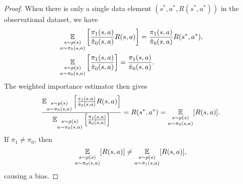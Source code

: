 \documentclass[12pt,letterpaper,boxed]{hmcpset}
\begin{document}
\begin{solution}
\begin{enumerate}[(a)]
    \begin{proof}
      When there is only a single data element $(s^*, a^*, R(s^*,a^*))$ in the observational dataset, we have
      \[
      \begin{aligned}
        & \operatorname*{\mathbb{E}}_{\substack{s \sim p(s) \\ a \sim \pi_0 (s,a)}}\qty[\frac{\pi_1(s,a)}{\hat \pi_0 (s,a)} R(s,a)] = \frac{\pi_1(s,a)}{\hat \pi_0 (s,a)} R(s^*,a^*), \\
        & \operatorname*{\mathbb{E}}_{\substack{s \sim p(s) \\ a \sim \pi_0 (s,a)}} \qty[\frac{\pi_1(s,a)}{\hat \pi_0 (s,a)}] = \frac{\pi_1(s,a)}{\hat \pi_0 (s,a)}.
      \end{aligned}
      \]
      The weighted importance estimator then gives
      \[
        \frac{\operatorname*{\mathbb{E}}_{\substack{s \sim p(s) \\ a \sim \pi_0 (s,a)}}\qty[\frac{\pi_1(s,a)}{\hat \pi_0 (s,a)} R(s,a)] }{ \operatorname*{\mathbb{E}}_{\substack{s \sim p(s) \\ a \sim \pi_0 (s,a)}}\qty[\frac{\pi_1(s,a)}{\hat \pi_0 (s,a)}] } = R(s^*,a^*) = \operatorname*{\mathbb{E}}_{\substack{s \sim p(s) \\ a \sim \pi_0 (s,a)}} [R(s,a)].
      \]
      If $\pi_1 \neq \pi_0$, then 
      \[
        \operatorname*{\mathbb{E}}_{\substack{s \sim p(s) \\ a \sim \pi_0 (s,a)}} [R(s,a)] \neq \operatorname*{\mathbb{E}}_{\substack{s \sim p(s) \\ a \sim \pi_1 (s,a)}} [R(s,a)],
      \]
      causing a bias.
    \end{proof}
  \end{enumerate}
\end{solution}
\end{document}
